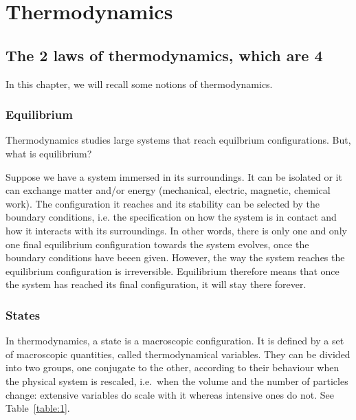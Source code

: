 \part{Thermodynamics}

\chapter{The 2 laws of thermodynamics, which are 4}

    In this chapter, we will recall some notions of thermodynamics.

\section{Equilibrium}

    Thermodynamics studies large systems that reach equilbrium configurations. But, what is equilibrium? 

    Suppose we have a system immersed in its surroundings. It can be isolated or it can exchange matter and/or energy (mechanical, electric, magnetic, chemical work). The configuration it reaches and its stability can be selected by the boundary conditions, i.e. the specification on how the system is in contact and how it interacts with its surroundings. In other words, there is only one and only one final equilibrium configuration towards the system evolves, once the boundary conditions have beeen given. However, the way the system reaches the equilibrium configuration is irreversible. Equilibrium therefore means that once the system has reached its final configuration, it will stay there forever. 

\section{States}

    In thermodynamics, a state is a macroscopic configuration. It is defined by a set of macroscopic quantities, called thermodynamical variables. They can be divided into two groups, one conjugate to the other, according to their behaviour when the physical system is rescaled, i.e.~when the volume and the number of particles change: extensive variables do scale with it whereas intensive ones do not. See Table~\ref{table:1}. 
    
